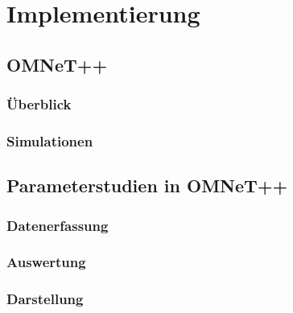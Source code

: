 \chapter{Implementierung}
\label{chapter:kap4}

\section{OMNeT++}

\subsection{Überblick}

\subsection{Simulationen}

\section{Parameterstudien in OMNeT++}

\subsection{Datenerfassung}

\subsection{Auswertung}

\subsection{Darstellung}

\section{}